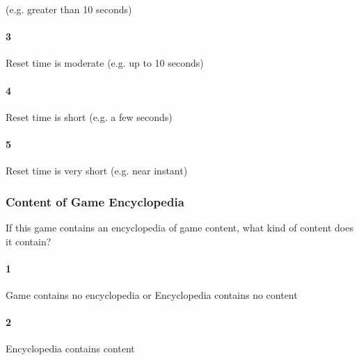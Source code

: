 (e.g. greater than 10 seconds)\paragraph{3}Reset time is moderate (e.g. up to 10 seconds)\paragraph{4}Reset time is short (e.g. a few seconds)\paragraph{5}Reset time is very short (e.g. near instant)\subsubsection{Content of Game Encyclopedia}If this game contains an encyclopedia of game content, what kind of content does it contain?\paragraph{1}Game contains no encyclopedia or Encyclopedia contains no content\paragraph{2}Encyclopedia contains content 